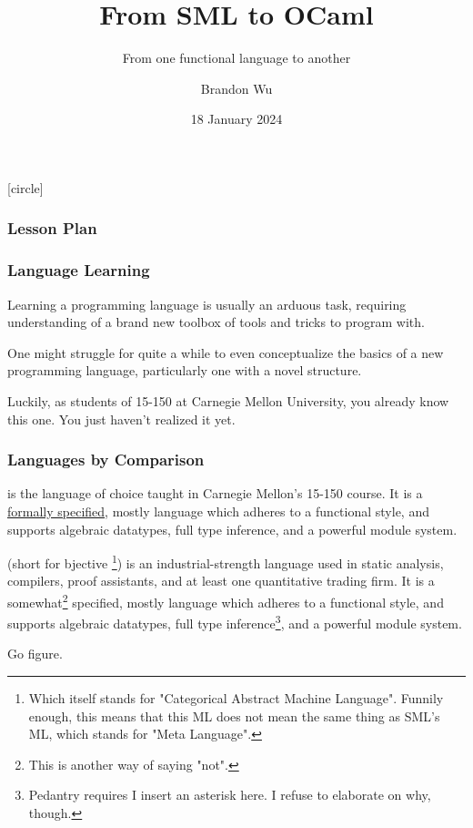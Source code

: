 \documentclass[aspectratio=169, handout]{beamer}
\title{From SML to OCaml} %
\subtitle{From one functional language to another} %
\date{18 January 2024} %
\author{Brandon Wu} %
\newif\ifcolorlambda
\begin{document}
\ifweb
\renewcommand{\pause}{}
\fi

[circle]

{
\begin{frame}[plain]
\colorlambdatrue
\titlepage
\end{frame}
}

\begin{frame}[fragile]
\frametitle{Lesson Plan}

\tableofcontents
\end{frame}


\begin{frame}[fragile]
  \frametitle{Language Learning}

  Learning a programming language is usually an arduous task, requiring
  understanding of a brand new toolbox of tools and tricks to program
  with.

  \vspace{\fill}

  One might struggle for quite a while to even conceptualize the basics of
  a new programming language, particularly one with a novel structure.

  \vspace{\fill}

  Luckily, as students of 15-150 at Carnegie Mellon University, you already
  know this one. You just haven't realized it yet.
\end{frame}

\begin{frame}[fragile]
  \frametitle{Languages by Comparison}
   is the language of choice taught in Carnegie Mellon's 15-150
  course. It is a
  {\color{blue}\href{https://smlfamily.github.io/sml97-defn.pdf}{formally
  specified}}, mostly  language which adheres to a functional style, and
  supports algebraic datatypes, full type inference, and a powerful module system.

  \vspace{\fill}

   (short for bjective \footnote{Which itself
  stands for "Categorical Abstract Machine Language". Funnily enough, this means
  that this ML does not mean the same thing as SML's ML, which stands for "Meta
  Language".}) is an industrial-strength language used in static analysis,
  compilers, proof assistants, and at least one quantitative trading firm. It is
  a somewhat\footnote{This is another way of saying "not".} specified, mostly
   language which adheres to a functional style, and supports
  algebraic datatypes, full type inference\footnote{Pedantry requires I insert
  an asterisk here. I refuse to elaborate on why, though.}, and a powerful
  module system.

  \vspace{\fill}

  Go figure.
\end{frame}
\end{document}

